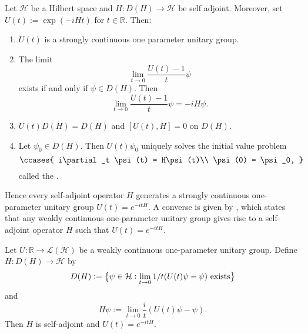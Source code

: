 \begin{theorem}
	Let $\mathcal{H}$ be a Hilbert space and $H : D(H) \to \mathcal{H}$ be self adjoint. Moreover, set $U(t) := \exp(-iHt)$ for $t \in \mathbb{R}$. Then:
	\begin{enumerate}[label=\textup{(}\alph*\textup{)},wide=0pt]
		\item $U(t)$ is a strongly continuous one parameter unitary group.
		\item The limit
			\begin{equation*}
				\lim_{t \to 0} \frac{U(t) - 1}{t}\psi
			\end{equation*}
			\noindent exists if and only if $\psi \in D(H)$. Then
			\begin{equation*}
				\lim_{t \to 0} \frac{U(t) - 1}{t}\psi = -iH\psi.
			\end{equation*}
		\item $U(t)D(H) = D(H)$ and $[U(t),H] = 0$ on $D(H)$.
		\item Let $\psi_0 \in D(H)$. Then $U(t)\psi_0$ uniquely solves the initial value problem
			\begin{equation}
				\ccases{
					i\partial_t \psi(t) = H\psi(t)\\
					\psi(0) = \psi_0,
				}
			\end{equation}
			\noindent called the .
	\end{enumerate}
\end{theorem}

Hence every self-adjoint operator $H$ generates a strongly continuous one-parameter unitary group $U(t) = e^{-itH}$. A converse is given by , which states that any weakly continuous one-parameter unitary group gives rise to a self-adjoint operator $H$ such that $U(t) = e^{-itH}$.

\begin{theorem}[Stone]
	Let $U : \mathbb{R} \to \mathcal{L}(\mathcal{H})$ be a weakly continuous one-parameter unitary group. Define $H : D(H) \to \mathcal{H}$	by
	\begin{equation*}
		D(H) := \cbr[1]{\psi \in \mathcal{H} : \lim_{t \to 0} 1/t (U(t)\psi - \psi) \text{ exists}}
	\end{equation*}
	\noindent and
	\begin{equation*}
		H\psi := \lim_{t \to 0} \frac{i}{t} (U(t)\psi - \psi).
	\end{equation*}
	Then $H$ is self-adjoint and $U(t) = e^{-itH}$.
\end{theorem}

